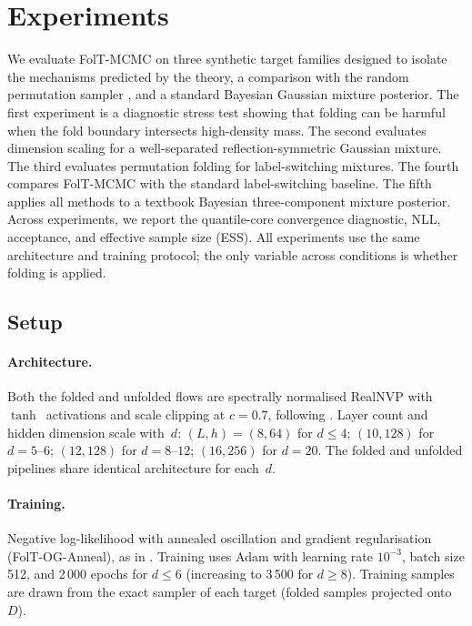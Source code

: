 %  

\section{Experiments}
\label{sec:experiments}

We evaluate FolT-MCMC on three synthetic target families designed to
isolate the mechanisms predicted by the theory, a comparison with
the random permutation sampler \citep{FruhwirthSchnatter2001},
and a standard Bayesian Gaussian mixture posterior.  The first
experiment is a diagnostic stress test showing that folding can be
harmful when the fold boundary intersects high-density mass.  The
second evaluates dimension scaling for a well-separated
reflection-symmetric Gaussian mixture.  The third evaluates
permutation folding for label-switching mixtures.  The fourth
compares FolT-MCMC with the standard label-switching baseline.  The
fifth applies all methods to a textbook Bayesian three-component
mixture posterior.  Across experiments, we report the quantile-core
convergence diagnostic, NLL, acceptance, and effective
sample size (ESS).
All experiments use the same architecture and training protocol;
the only variable across conditions is whether folding is applied.


\subsection{Setup}
\label{sec:exp_setup}

\paragraph{Architecture.}
Both the folded and unfolded flows are spectrally normalised
RealNVP \citep{DinhSohlDickstein2017,Miyato2018} with
$\tanh$~activations and scale clipping at $c = 0.7$, following
\citet{LCNF}.  Layer count and hidden dimension
scale with~$d$: $(L, h) = (8, 64)$ for $d \leq 4$;
$(10, 128)$ for $d = 5$--$6$; $(12, 128)$ for $d = 8$--$12$;
$(16, 256)$ for $d = 20$.  The folded and unfolded pipelines share
identical architecture for each~$d$.

\paragraph{Training.}
Negative log-likelihood with annealed oscillation and gradient
regularisation (FolT-OG-Anneal), as in \citet{CerTMCMC}.
Training uses Adam with learning rate $10^{-3}$, batch size 512,
and 2\,000 epochs for $d \leq 6$ (increasing to 3\,500 for
$d \geq 8$).  Training samples are drawn from the exact sampler
of each target (folded samples projected onto~$D$).


